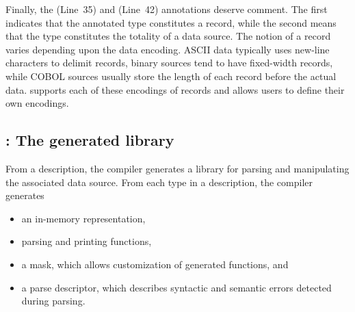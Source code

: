 Finally, the  (Line~35) and  (Line~42) annotations deserve comment.  The first
indicates that the annotated type constitutes a record,
while the second means that the type constitutes the totality of a data source.  
The notion of a record varies depending upon the data encoding.  
ASCII data typically uses new-line characters to delimit 
records, binary sources tend to have fixed-width records, while 
COBOL sources usually store the length of each record before the actual data.
\pads{} supports each of these encodings of records and allows users to define
their own encodings.  

\subsection{\pads{}: The generated library}
From a description, the \pads{} compiler generates a \C{} library
for parsing and manipulating the associated data source.  
From each type in a \pads{} description, the compiler generates 
\begin{itemize}
\setlength{\itemsep}{0ex plus0.2ex}
\item an in-memory representation, 
\item parsing and printing functions, 
\item a mask, which allows customization of generated functions, and
\item a parse descriptor, which describes syntactic and semantic errors detected during parsing.
\end{itemize}

